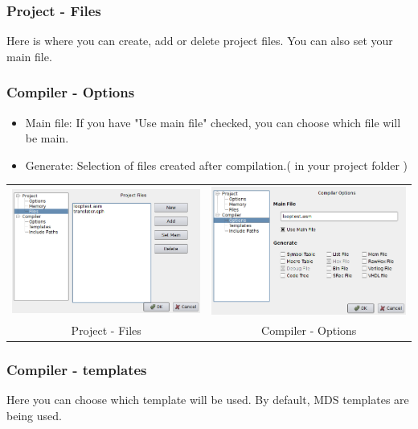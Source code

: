         \clearpage
        \subsubsection{Project - Files}
        Here is where you can create, add or delete project files. You can also set your main file.

        \subsubsection{Compiler - Options}
            \begin{itemize}
                \item Main file: If you have "Use main file" checked, you can choose which file will be main.
                \item Generate: Selection of files created after compilation.( in your project folder )
            \end{itemize}

        \begin{table}[h!]
            \begin{tabular}{cc}
                \includegraphics[width=.5\textwidth]{img/NewImg/config3.png}
                    &
                \includegraphics[width=.5\textwidth]{img/NewImg/config4.png}
                    \\
                Project - Files & Compiler - Options
            \end{tabular}
        \end{table}

        \subsubsection{Compiler - templates}
        Here you can choose which template will be used. By default, MDS templates are being used.

